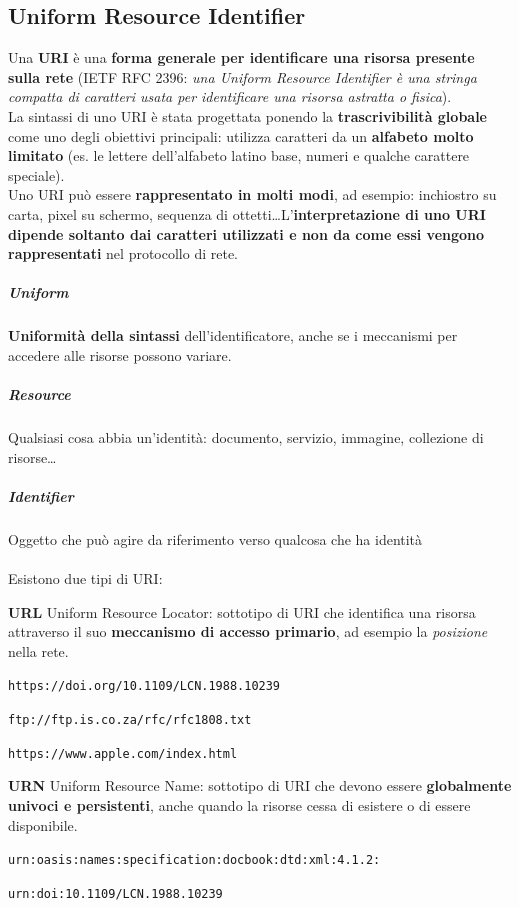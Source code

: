 \documentclass[10pt]{article}
\begin{document}
\subsection{Uniform Resource Identifier}
Una \textbf{URI} è una \textbf{forma generale per identificare una risorsa presente sulla rete} (IETF RFC 2396: \textit{una Uniform Resource Identifier è una stringa compatta di caratteri usata per identificare una risorsa astratta o fisica}).\\
La sintassi di uno URI è stata progettata ponendo la \textbf{trascrivibilità globale} come uno degli obiettivi principali: utilizza caratteri da un \textbf{alfabeto molto limitato} (es. le lettere dell'alfabeto latino base, numeri e qualche carattere speciale).\\
Uno URI può essere \textbf{rappresentato in molti modi}, ad esempio: inchiostro su carta, pixel su schermo, sequenza di ottetti\ldots L'\textbf{interpretazione di uno URI dipende soltanto dai caratteri utilizzati e non da come essi vengono rappresentati} nel protocollo di rete.
\subparagraph{Uniform} \textbf{Uniformità della sintassi} dell'identificatore, anche se i meccanismi per accedere alle risorse possono variare.
\subparagraph{Resource} Qualsiasi cosa abbia un'identità: documento, servizio, immagine, collezione di risorse\ldots
\subparagraph{Identifier} Oggetto che può agire da riferimento verso qualcosa che ha identità
\paragraph{}Esistono due tipi di URI:
\begin{list}{}{}
\item \textbf{URL} Uniform Resource Locator: sottotipo di URI che identifica una risorsa attraverso il suo \textbf{meccanismo di accesso primario}, ad esempio la \textit{posizione} nella rete.\\
\begin{list}{URL}{Esempi:}
\item \texttt{https://doi.org/10.1109/LCN.1988.10239}
\item \texttt{ftp://ftp.is.co.za/rfc/rfc1808.txt}
\item \texttt{https://www.apple.com/index.html}
\end{list}
\item \textbf{URN} Uniform Resource Name: sottotipo di URI che devono essere \textbf{globalmente univoci e persistenti}, anche quando la risorse cessa di esistere o di essere disponibile.\\
\begin{list}{URN}{Esempi:}
\item \texttt{urn:oasis:names:specification:docbook:dtd:xml:4.1.2:}
\item \texttt{urn:doi:10.1109/LCN.1988.10239}
\end{list}
\end{list}
\pagebreak
\end{document}
